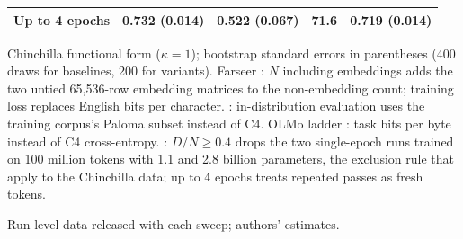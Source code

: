 \begin{table}[tp]
\begin{tabular}{@{}lcccc@{}}
\quad Up to 4 epochs & 0.732 (0.014) & 0.522 (0.067) & 71.6 & 0.719 (0.014) \\
\bottomrule
\end{tabular}
\par\smallskip
\begin{tablenotes}Chinchilla functional form ($\kappa=1$); bootstrap standard errors in parentheses (400 draws for
baselines, 200 for variants). Farseer \citep{li2025predictableb}: $N$ including embeddings adds the two untied
65,536-row embedding matrices to the non-embedding count; training loss replaces English bits per character.
\citet{gadre2024language}: in-distribution evaluation uses the training corpus's Paloma subset instead of C4. OLMo
ladder \citep{bhagia2024establishing}: task bits per byte instead of C4 cross-entropy. \citet{muennighoff2023scaling}:
$D/N\geq0.4$ drops the two single-epoch runs trained on 100 million tokens with 1.1 and 2.8 billion parameters, the
exclusion rule that \citet{besiroglu2024chinchilla} apply to the Chinchilla data; up to 4 epochs treats repeated
passes as fresh tokens.\end{tablenotes}
\begin{tablenotes}[Source]Run-level data released with each sweep; authors' estimates.\end{tablenotes}
\end{table}
